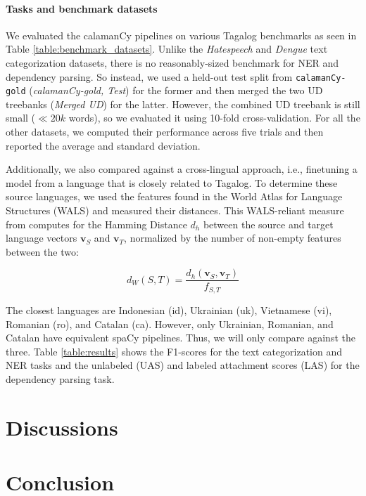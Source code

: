 \documentclass[11pt]{article}
\begin{document}
\paragraph*{Tasks and benchmark datasets} 
We evaluated the calamanCy pipelines on various Tagalog benchmarks as seen in Table \ref{table:benchmark_datasets}.
Unlike the \textit{Hatespeech} and \textit{Dengue} text categorization datasets, there is no reasonably-sized benchmark for NER and dependency parsing.
So instead, we used a held-out test split from \texttt{calamanCy-gold} (\textit{calamanCy-gold, Test}) for the former and then merged the two UD treebanks (\textit{Merged UD}) for the latter. 
However, the combined UD treebank is still small ($\ll 20k$ words), so we evaluated it using 10-fold cross-validation.
For all the other datasets, we computed their performance across five trials and then reported the average and standard deviation.

Additionally, we also compared against a cross-lingual approach, i.e., finetuning a model from a language that is closely related to Tagalog.
To determine these source languages, we used the features found in the World Atlas for Language Structures (WALS) \citep{Haspelmath2005WALS} and measured their distances.
This WALS-reliant measure from \citet{Agic2017CrossLingualPS} computes for the Hamming Distance $d_h$ between the source and target language vectors $\mathbf{v}_S$ and $\mathbf{v}_T$, normalized by the number of non-empty features between the two:

$$
d_W(S,T) = \dfrac{d_h(\mathbf{v}_S,\mathbf{v}_T)}{f_{S,T}}
$$

The closest languages are Indonesian (id), Ukrainian (uk), Vietnamese (vi), Romanian (ro), and Catalan (ca).
However, only Ukrainian, Romanian, and Catalan have equivalent spaCy pipelines.
Thus, we will only compare against the three.
Table \ref{table:results} shows the F1-scores for the text categorization and NER tasks and the unlabeled (UAS) and labeled attachment scores (LAS) for the dependency parsing task.


\section{Discussions}


\section{Conclusion}







\end{document}
